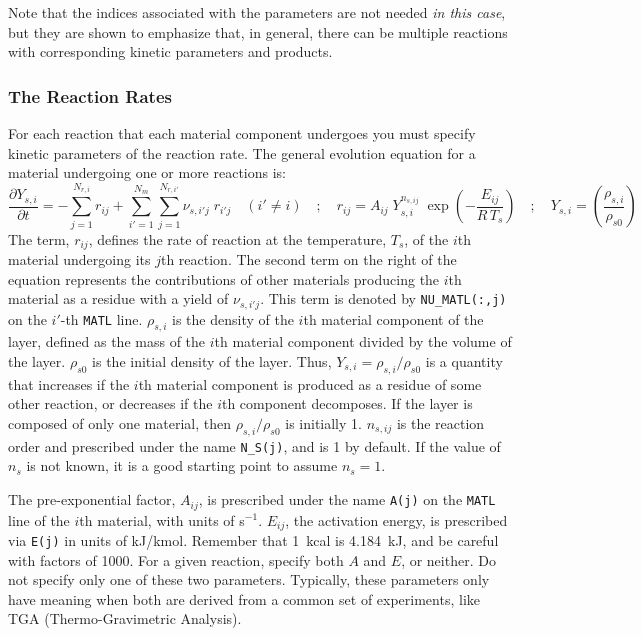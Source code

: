 \documentclass[11pt]{book}
\newcommand{\ct}{\tt\small}
\newcommand{\dod}[2]{\frac{\partial #1}{\partial #2}}
\newcommand{\be}{\begin{equation}}
\newcommand{\ee}{\end{equation}}
\begin{document}
\noindent Note that the indices associated with the parameters are not needed {\em in this case}, but they are shown to emphasize that, in general, there can
be multiple reactions with corresponding kinetic parameters and products.

\subsubsection{The Reaction Rates}

For each reaction that each material component undergoes you must specify kinetic parameters of the reaction rate. The general evolution equation for
a material undergoing one or more reactions is:
\be
  \dod{Y_{s,i}}{t} = - \sum_{j=1}^{N_{r,i}} r_{ij} + \sum_{i'=1}^{N_m} \sum_{j=1}^{N_{r,i'}} \nu_{s,i'j} \; r_{i'j} \quad (i' \neq i)  \quad ; \quad
  r_{ij} = A_{ij} \; Y_{s,i}^{n_{s,ij}} \; \exp \left(-\frac{E_{ij}}{R \, T_s} \right) \quad ; \quad Y_{s,i} = \left( \frac{\rho_{s,i}}{\rho_{s0}} \right)
  \label{rr}
\ee
The term, $r_{ij}$, defines the rate of reaction at the temperature, $T_s$, of the $i$th material undergoing its $j$th reaction.
The second term on the right of the equation represents the contributions of other materials producing the $i$th material as a residue with a yield
of $\nu_{s,i'j}$. This term is denoted by {\ct NU\_MATL(:,j)} on the $i'$-th {\ct MATL} line.
$\rho_{s,i}$ is the density of the $i$th material component of the layer, defined as the mass of the $i$th material component
divided by the volume of the layer.  $\rho_{s0}$ is the initial
density of the layer. Thus, $Y_{s,i}=\rho_{s,i}/\rho_{s0}$ is a quantity that
increases if the $i$th material component is produced as a residue of some other
reaction, or decreases if the $i$th component decomposes.  If the
layer is composed of only one material, then $\rho_{s,i}/\rho_{s0}$ is initially 1.
$n_{s,ij}$ is the reaction order and prescribed under the name {\ct N\_S(j)}, and is 1 by default.
If the value of $n_s$ is not known, it is a good starting point to assume $n_s=1$.

The pre-exponential factor, $A_{ij}$, is prescribed under the name
{\ct A(j)} on the {\ct MATL} line of the $i$th material, with units of s$^{-1}$. $E_{ij}$, the activation energy,
is prescribed via {\ct E(j)} in units of kJ/kmol. Remember that 1~kcal
is 4.184~kJ, and be careful with factors of 1000. For a given reaction, specify both $A$ and $E$, or neither. Do not specify
only one of these two parameters. Typically, these parameters only have meaning when both are derived from a common set of
experiments, like TGA (Thermo-Gravimetric Analysis).
\end{document}

